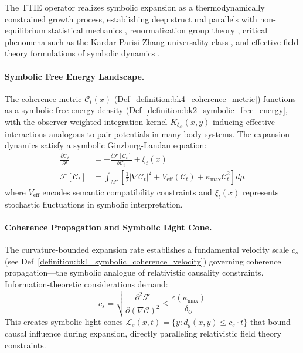 \begin{demonstratio}
\label{demonstratio:symbolic_thermodynamics}

The TTIE operator realizes symbolic expansion as a thermodynamically constrained growth process, establishing deep structural parallels with non-equilibrium statistical mechanics \cite{chaikin1995principles}, renormalization group theory \cite{tauber2014critical}, critical phenomena such as the Kardar-Parisi-Zhang universality class \cite{kardar1986dynamic}, and effective field theory formulations of symbolic dynamics \cite{zinn2002quantum}.
  

\paragraph{Symbolic Free Energy Landscape.} 
The coherence metric $\mathcal{C}_t(x)$ (Def~\ref{definition:bk4_coherence_metric}) functions as a symbolic free energy density (Def~\ref{definition:bk2_symbolic_free_energy}, with the observer-weighted integration kernel $K_{\delta_{\mathcal{O}}}(x,y)$ inducing effective interactions analogous to pair potentials in many-body systems. The expansion dynamics satisfy a symbolic Ginzburg-Landau equation:
\begin{align}
\frac{\partial \mathcal{C}_t}{\partial t} &= -\frac{\delta \mathcal{F}[\mathcal{C}_t]}{\delta \mathcal{C}_t} + \xi_t(x) \\[4pt]
\mathcal{F}[\mathcal{C}_t] &= \int_{\widetilde{M}'} \left[ \frac{1}{2}|\nabla \mathcal{C}_t|^2 + V_{\text{eff}}(\mathcal{C}_t) + \kappa_{\max} \mathcal{C}_t^2 \right] d\mu
\end{align}
where $V_{\text{eff}}$ encodes semantic compatibility constraints and $\xi_t(x)$ represents stochastic fluctuations in symbolic interpretation.

\paragraph{Coherence Propagation and Symbolic Light Cone.}
The curvature-bounded expansion rate establishes a fundamental velocity scale $c_s$ (see Def~\ref{definition:bk1_symbolic_coherence_velocity}) governing coherence propagation—the symbolic analogue of relativistic causality constraints. Information-theoretic considerations demand:
\begin{equation}
c_s = \sqrt{\frac{\partial^2 \mathcal{F}}{\partial(\nabla \mathcal{C})^2}} \leq \frac{\varepsilon(\kappa_{\max})}{\delta_{\mathcal{O}}}
\end{equation}
This creates symbolic light cones $\mathcal{L}_s(x,t) = \{y : d_g(x,y) \leq c_s \cdot t\}$ that bound causal influence during expansion, directly paralleling relativistic field theory constraints.


\end{demonstratio}
